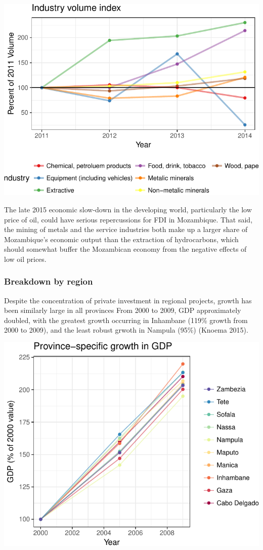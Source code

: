 \documentclass[]{article}
\begin{document}
\begin{center}\includegraphics{figures/unnamed-chunk-12-1} \end{center}

The late 2015 economic slow-down in the developing world, particularly
the low price of oil, could have serious repercussions for FDI in
Mozambique. That said, the mining of metals and the service industries
both make up a larger share of Mozambique's economic output than the
extraction of hydrocarbons, which should somewhat buffer the Mozambican
economy from the negative effects of low oil prices.

\subsubsection{Breakdown by region}\label{breakdown-by-region}

Despite the concentration of private investment in regional projects,
growth has been similarly large in all provinces From 2000 to 2009, GDP
approximately doubled, with the greatest growth occurring in Inhambane
(119\% growth from 2000 to 2009), and the least robust grwoth in Nampula
(95\%) (Knoema 2015).

\begin{center}\includegraphics{figures/unnamed-chunk-13-1} \end{center}
\end{document}
